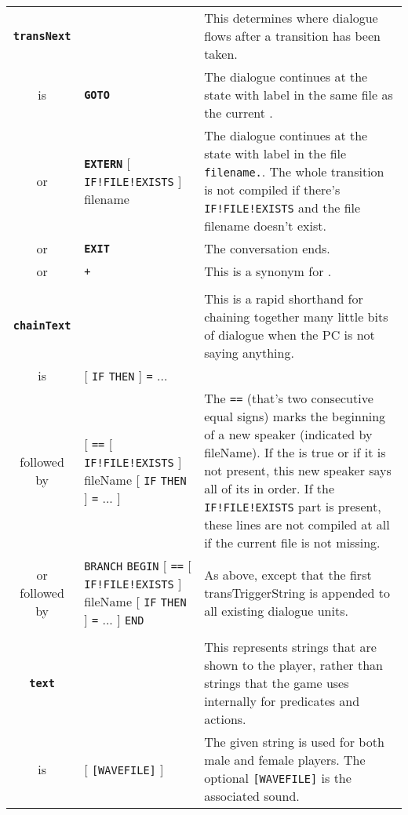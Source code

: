 \documentclass{article}
\def\ttref#1{\ahrefloc{#1}{\tt #1}}
\def\DEFINE#1{{\tt \bf #1}\label{#1}\index{#1}}
\def\t#1{{\tt #1}}
\def\Ob{{\color{red} [ }}
\def\Oe{{\color{red} ] }}
\begin{document}
\begin{tabular}{cp{10in}|p{10in}}
\\

\DEFINE{transNext} & & This determines where dialogue flows after a
transition has been taken. \\
is & \DEFINE{GOTO} \ttref{stateLabel} &
  The dialogue continues at the state with label \ttref{stateLabel} in the
  same \ttref{DLG} file as the current \ttref{state}. \\
or & \DEFINE{EXTERN} \Ob \t{IF!FILE!EXISTS} \Oe filename \ttref{stateLabel} &
  The dialogue continues at the state with label \ttref{stateLabel} in the
  file \t{filename.}\ttref{DLG}. The whole transition is not compiled if there's
  \t{IF!FILE!EXISTS} and the file filename doesn't exist. \\
or & \DEFINE{EXIT} &
  The conversation ends. \\
or & \t{+} \ttref{stateLabel} &
  This is a synonym for \ttref{GOTO}. \\

\\

\DEFINE{chainText} & & This is a rapid shorthand for chaining together many
little bits of dialogue when the PC is not saying anything. \\
is & \Ob \t{IF} \ttref{transTriggerString} \t{THEN} \Oe \ttref{sayText}
      \t{=} \ttref{sayText} ... & \\
followed by &
      \Ob \t{==} \Ob \t{IF!FILE!EXISTS} \Oe fileName
      \Ob \t{IF} \ttref{transTriggerString} \t{THEN} \Oe \ttref{sayText}
      \t{=} \ttref{sayText} ... \Oe &
      The \t{==} (that's two consecutive equal signs) marks the beginning of a
      new speaker (indicated by fileName).  If the
      \ttref{transTriggerString} is true or if it is not present, this new
      speaker says all of its \ttref{sayText} in order. If the \t{IF!FILE!EXISTS}
      part is present, these lines are not compiled at all if the current file is
      not missing.
      \\
or followed by &
    \t{BRANCH} \ttref{transTriggerString} \t{BEGIN}
      \Ob \t{==} \Ob \t{IF!FILE!EXISTS} \Oe fileName
      \Ob \t{IF} \ttref{transTriggerString} \t{THEN} \Oe \ttref{sayText}
      \t{=} \ttref{sayText} ... \Oe
    \t{END} &
      As above, except that the first transTriggerString is appended to all
      existing dialogue units.\\
\\

\DEFINE{text} & & This represents strings that are shown to the player,
rather than strings that the game uses internally for predicates and
actions. \\
is & \ttref{String} \Ob \t{[WAVEFILE]} \Oe & The given string is used for both male and
female players. The optional \t{[WAVEFILE]} is the associated sound. \\


\end{tabular}
\end{document}
